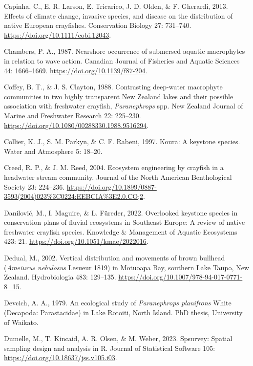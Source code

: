 \documentclass[
  letterpaper,
  DIV=11,
  numbers=noendperiod]{scrartcl}
\newlength{\cslhangindent}
\newenvironment{CSLReferences}[2] %
 {\begin{list}{}{%
  \setlength{\itemindent}{0pt}
  \setlength{\leftmargin}{0pt}
  \setlength{\parsep}{0pt}
  \ifodd #1
   \setlength{\leftmargin}{\cslhangindent}
   \setlength{\itemindent}{-1\cslhangindent}
  \fi
  \setlength{\itemsep}{#2\baselineskip}}}
 {\end{list}}
\begin{document}
\begin{CSLReferences}{0}{1}
Capinha, C., E. R. Larson, E. Tricarico, J. D. Olden, \& F. Gherardi,
2013. Effects of climate change, invasive species, and disease on the
distribution of native {European} crayfishes. Conservation Biology 27:
731--740. \url{https://doi.org/10.1111/cobi.12043}.

Chambers, P. A., 1987. Nearshore occurrence of submersed aquatic
macrophytes in relation to wave action. Canadian Journal of Fisheries
and Aquatic Sciences 44: 1666--1669.
\url{https://doi.org/10.1139/f87-204}.

Coffey, B. T., \& J. S. Clayton, 1988. Contrasting deep-water macrophyte
communities in two highly transparent {New Zealand} lakes and their
possible association with freshwater crayfish, {\emph{Paranephrops}}
spp. New Zealand Journal of Marine and Freshwater Research 22: 225--230.
\url{https://doi.org/10.1080/00288330.1988.9516294}.

Collier, K. J., S. M. Parkyn, \& C. F. Rabeni, 1997. Koura: A keystone
species. Water and Atmosphere 5: 18--20.

Creed, R. P., \& J. M. Reed, 2004. Ecosystem engineering by crayfish in
a headwater stream community. Journal of the North American
Benthological Society 23: 224--236.
\url{https://doi.org/10.1899/0887-3593(2004)023\%3C0224:EEBCIA\%3E2.0.CO;2}.

Danilović, M., I. Maguire, \& L. Füreder, 2022. Overlooked keystone
species in conservation plans of fluvial ecosystems in {Southeast
Europe}: A review of native freshwater crayfish species. Knowledge \&
Management of Aquatic Ecosystems 423: 21.
\url{https://doi.org/10.1051/kmae/2022016}.

Dedual, M., 2002. Vertical distribution and movements of brown bullhead
({\emph{Ameiurus nebulosus}} {Lesueur} 1819) in {Motuoapa Bay}, southern
{Lake Taupo}, {New Zealand}. Hydrobiologia 483: 129--135.
\url{https://doi.org/10.1007/978-94-017-0771-8_15}.

Devcich, A. A., 1979. An ecological study of {\emph{Paranephrops
planifrons}} {White} ({Decapoda}: {Parastacidae}) in {Lake Rotoiti},
{North Island}. PhD thesis, University of Waikato.

Dumelle, M., T. Kincaid, A. R. Olsen, \& M. Weber, 2023. Spsurvey:
Spatial sampling design and analysis in {R}. Journal of Statistical
Software 105: \url{https://doi.org/10.18637/jss.v105.i03}.


\end{CSLReferences}
\end{document}
